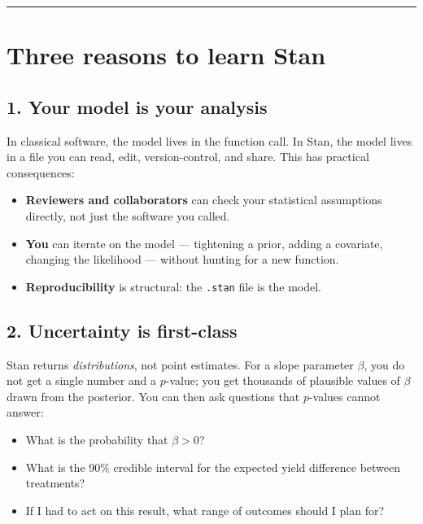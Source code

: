 \documentclass[
  11pt,
  a4paper,
  oneside,
  openany]{scrbook}
\providecommand{\tightlist}{%
  \setlength{\itemsep}{0pt}\setlength{\parskip}{0pt}}\usepackage{longtable,booktabs,array}
\begin{document}
\begin{center}\rule{0.5\linewidth}{0.5pt}\end{center}

\section{Three reasons to learn Stan}\label{three-reasons-to-learn-stan}

\subsection{1. Your model is your
analysis}\label{your-model-is-your-analysis}

In classical software, the model lives in the function call. In Stan,
the model lives in a file you can read, edit, version-control, and
share. This has practical consequences:

\begin{itemize}
\tightlist
\item
  \textbf{Reviewers and collaborators} can check your statistical
  assumptions directly, not just the software you called.
\item
  \textbf{You} can iterate on the model --- tightening a prior, adding a
  covariate, changing the likelihood --- without hunting for a new
  function.
\item
  \textbf{Reproducibility} is structural: the \texttt{.stan} file is the
  model.
\end{itemize}

\subsection{2. Uncertainty is
first-class}\label{uncertainty-is-first-class}

Stan returns \emph{distributions}, not point estimates. For a slope
parameter \(\beta\), you do not get a single number and a \(p\)-value;
you get thousands of plausible values of \(\beta\) drawn from the
posterior. You can then ask questions that \(p\)-values cannot answer:

\begin{itemize}
\tightlist
\item
  What is the probability that \(\beta > 0\)?
\item
  What is the 90\% credible interval for the expected yield difference
  between treatments?
\item
  If I had to act on this result, what range of outcomes should I plan
  for?
\end{itemize}
\end{document}
